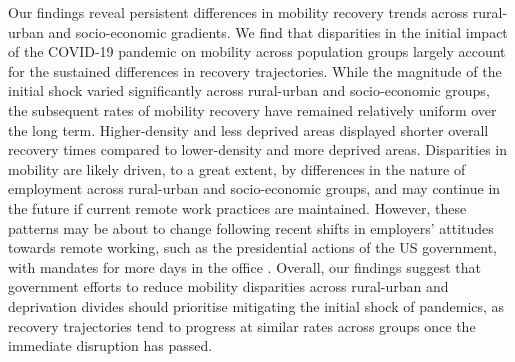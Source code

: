 \documentclass[fleqn,10pt]{wlscirep}
\begin{document}
Our findings reveal persistent differences in mobility recovery trends across rural-urban and socio-economic gradients. We find that disparities in the initial impact of the COVID-19 pandemic on mobility across population groups largely account for the sustained differences in recovery trajectories. While the magnitude of the initial shock varied significantly across rural-urban and socio-economic groups, the subsequent rates of mobility recovery have remained relatively uniform over the long term. Higher-density and less deprived areas displayed shorter overall recovery times compared to lower-density and more deprived areas. Disparities in mobility are likely driven, to a great extent, by differences in the nature of employment \cite{ILO21} across rural-urban and socio-economic groups, and may continue in the future if current remote work practices are maintained. However, these patterns may be about to change following recent shifts in employers' attitudes towards remote working, such as the presidential actions of the US government, with mandates for more days in the office \cite{WhiteHouse2025Return, CIPD2025LMO}. Overall, our findings suggest that government efforts to reduce mobility disparities across rural-urban and deprivation divides should prioritise mitigating the initial shock of pandemics, as recovery trajectories tend to progress at similar rates across groups once the immediate disruption has passed.
\end{document}
